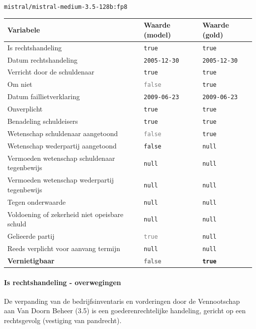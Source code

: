\documentclass[
  dutch,
  a4paper,
]{article}
\begin{document}
\texttt{mistral/mistral-medium-3.5-128b:fp8}

\begin{center}
\small
\begin{tabular}{@{}p{7.4cm}p{2.6cm}p{2.6cm}@{}}
\toprule
Variabele & Waarde (model) & Waarde (gold) \\
\midrule
Is rechtshandeling & \texttt{true} & \texttt{true} \\
Datum rechtshandeling & \texttt{2005-12-30} & \texttt{2005-12-30} \\
Verricht door de schuldenaar & \texttt{true} & \texttt{true} \\
Om niet & \textcolor{gray}{\texttt{false}} & \texttt{true} \\
Datum faillietverklaring & \texttt{2009-06-23} & \texttt{2009-06-23} \\
Onverplicht & \texttt{true} & \texttt{true} \\
Benadeling schuldeisers & \texttt{true} & \texttt{true} \\
Wetenschap schuldenaar aangetoond & \textcolor{gray}{\texttt{false}} & \texttt{true} \\
Wetenschap wederpartij aangetoond & \texttt{false} & \texttt{null} \\
Vermoeden wetenschap schuldenaar tegenbewijs & \texttt{null} & \texttt{null} \\
Vermoeden wetenschap wederpartij tegenbewijs & \texttt{null} & \texttt{null} \\
Tegen onderwaarde & \texttt{null} & \texttt{null} \\
Voldoening of zekerheid niet opeisbare schuld & \texttt{null} & \texttt{null} \\
Gelieerde partij & \textcolor{gray}{\texttt{true}} & \texttt{null} \\
Reeds verplicht voor aanvang termijn & \texttt{null} & \texttt{null} \\
\textbf{Vernietigbaar} & \textbf{\textcolor{gray}{\texttt{false}}} & \textbf{\texttt{true}} \\
\bottomrule
\end{tabular}
\end{center}

\paragraph{Is rechtshandeling - overwegingen}\label{is-rechtshandeling---overwegingen}

De verpanding van de bedrijfsinventaris en vorderingen door de Vennootschap aan Van Doorn Beheer (3.5) is een goederenrechtelijke handeling, gericht op een rechtsgevolg (vestiging van pandrecht).
\end{document}
